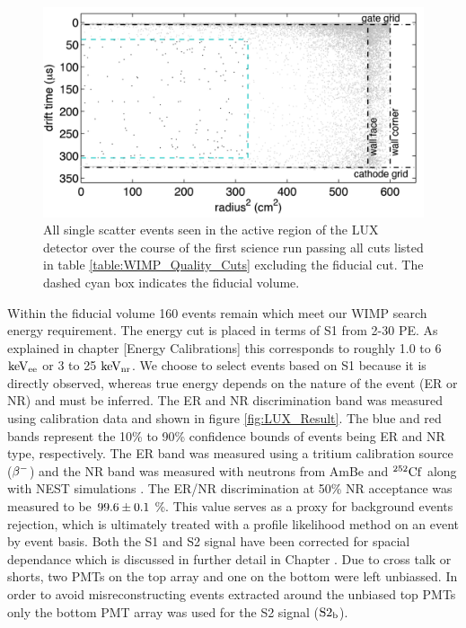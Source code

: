  \begin{figure}[h!]\centering
\includegraphics[width=130mm]{Chapter_LUX_Det/LUX_Result_Event.png}
\caption{All single scatter events seen in the active region of the LUX detector over the course of the first science run passing all cuts listed in table \ref{table:WIMP_Quality_Cuts} excluding the fiducial cut. The dashed cyan box indicates the fiducial volume.}
\label{fig:LUX_Result_Event}
\end{figure}

Within the fiducial volume 160 events remain which meet our WIMP search energy requirement. The energy cut is placed in terms of S1 from 2-30 PE. As explained in chapter [Energy Calibrations] this corresponds to roughly 1.0 to 6 $\rm keV_{ee}$ or 3 to 25 $\rm keV_{nr}$. We choose to select events based on S1 because it is directly observed, whereas true energy depends on the nature of the event (ER or NR) and must be inferred. %
The ER and NR discrimination band was measured using calibration data and shown in figure \ref{fig:LUX_Result}. The blue and red bands represent the 10\% to 90\% confidence bounds of events being ER and NR type, respectively. The ER band was measured using a tritium calibration source ($\rm \beta^{-}$) and the NR band was measured with neutrons from AmBe and $\rm^{252}Cf$ along with NEST simulations \cite{NEST_2013}. The ER/NR discrimination at 50\% NR acceptance was measured to be $\rm 99.6\pm0.1$ \%. This value serves as a proxy for background events rejection, which is ultimately treated with a profile likelihood method on an event by event basis. Both the S1 and S2 signal have been corrected for spacial dependance which is discussed in further detail in Chapter \label{Ch:3}. Due to cross talk or shorts, two PMTs on the top array and one on the bottom were left unbiassed.  In order to avoid misreconstructing events extracted around the unbiased top PMTs only the bottom PMT array was used for the S2 signal ($\rm S2_b$).

